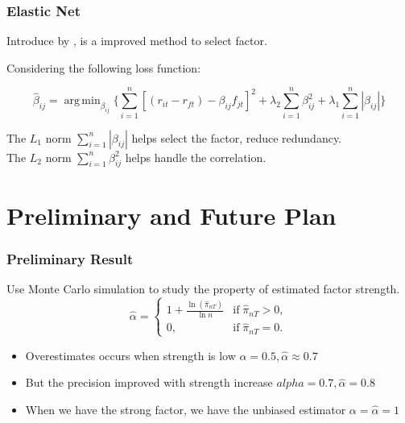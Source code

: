 \documentclass[12pt]{beamer}
\DeclareMathOperator*{\argmin}{arg\,min}
\begin{document}
\begin{frame}
\frametitle{Elastic Net}
Introduce by , is a improved method to select factor.

Considering the following loss function:

	\[   \hat{\beta}_{ij}  = \argmin_{\beta_{ij}}\{\sum_{i = 1}^{n}[(r_{it} - r_{ft}) - \beta_{ij }f_{jt}]^2 + \lambda_2\sum_{i = 1}^{n}\beta_{ij}^2  + \lambda_1\sum_{i = 1}^{n}|\beta_{ij}|     \}    \]
	
	The $L_1$ norm $\sum_{i = 1}^{n}|\beta_{ij}|$ helps select the factor, reduce redundancy.\\
    The $L_2$ norm $\sum_{i = 1}^{n}\beta_{ij}^2 $ helps handle the correlation.

\end{frame}




\section{Preliminary and Future Plan}


\begin{frame}
	\frametitle{Preliminary Result}
Use Monte Carlo simulation to study the property of estimated factor strength.\\
\[ \hat{\alpha} = \begin{cases}
1+\frac{\ln(\hat{\pi}_{nT})}{\ln n} & \text{if}\; \hat{\pi}_{nT} > 0,\\
0, & \text{if}\; \hat{\pi}_{nT} = 0.
\end{cases} \]
\begin{itemize}
\item Overestimates occurs when strength is low $\alpha = 0.5, \hat{\alpha} \approx 0.7$
\item But the precision improved with strength increase $alpha = 0.7, \hat{\alpha} = 0.8$
\item When we have the strong factor, we have the unbiased estimator $\alpha = \hat{\alpha} = 1$
\end{itemize}
	
\end{frame}
\end{document}
